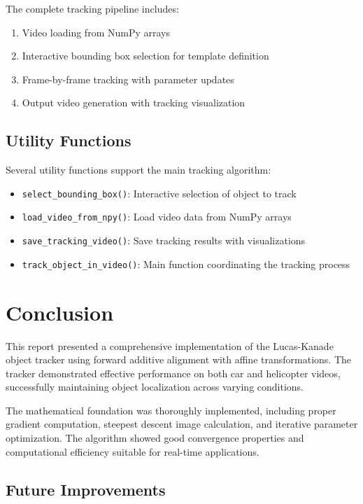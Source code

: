 \documentclass[12pt,a4paper]{article}
\begin{document}
The complete tracking pipeline includes:
\begin{enumerate}
\item Video loading from NumPy arrays
\item Interactive bounding box selection for template definition
\item Frame-by-frame tracking with parameter updates
\item Output video generation with tracking visualization
\end{enumerate}

\subsection{Utility Functions}

Several utility functions support the main tracking algorithm:

\begin{itemize}
\item \texttt{select\_bounding\_box()}: Interactive selection of object to track
\item \texttt{load\_video\_from\_npy()}: Load video data from NumPy arrays
\item \texttt{save\_tracking\_video()}: Save tracking results with visualizations
\item \texttt{track\_object\_in\_video()}: Main function coordinating the tracking process
\end{itemize}

\section{Conclusion}

This report presented a comprehensive implementation of the Lucas-Kanade object tracker using forward additive alignment with affine transformations. The tracker demonstrated effective performance on both car and helicopter videos, successfully maintaining object localization across varying conditions.

The mathematical foundation was thoroughly implemented, including proper gradient computation, steepest descent image calculation, and iterative parameter optimization. The algorithm showed good convergence properties and computational efficiency suitable for real-time applications.

\subsection{Future Improvements}
\end{document}
